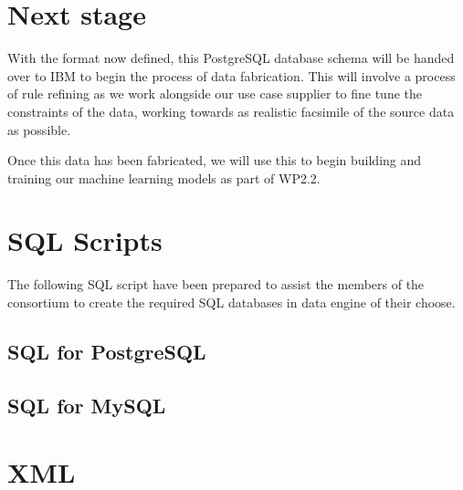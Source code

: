 \section{Next stage}
With the format now defined, this PostgreSQL database schema will be handed over to IBM to begin the process of data fabrication. This will involve a process of rule refining as we work alongside our use case supplier to fine tune the constraints of the data, working towards as realistic facsimile of the source data as possible.

Once this data has been fabricated, we will use this to begin building and training our machine learning models as part of WP2.2.

\section{SQL Scripts}

The following SQL script have been prepared to assist the members of the consortium to create the required SQL databases in data engine of their choose.

\subsection{SQL for PostgreSQL}




\subsection{SQL for MySQL}



\section{XML}

